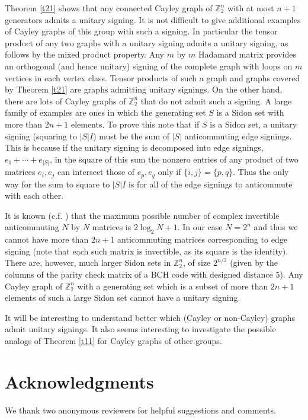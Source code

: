 \documentclass[11pt]{article}
\begin{document}
Theorem \ref{t21} shows that any connected Cayley graph of 
${\mathbb{Z}_{2}^{n}}$ with at most $n+1$ generators admits a unitary signing. 
It is not difficult to give additional examples of
Cayley graphs of this group with such a signing. In particular
the tensor product of any two graphs with a unitary signing
admits a unitary signing, as follows by the mixed product property.
Any $m$ by $m$ Hadamard matrix provides an orthogonal (and hence
unitary) signing of the complete graph with loops on $m$ vertices
in each vertex class. Tensor products of such a graph and graphs
covered by Theorem \ref{t21} are graphs admitting unitary
signings. On the other hand, there are lots of Cayley graphs of
${\mathbb{Z}_{2}^{n}}$ that do not admit  such a signing. A large family of examples
are ones in which the generating set $S$ is a Sidon set with more
than  $2n+1$ elements. To prove this note that if
$S$ is a Sidon set, a unitary signing (squaring to $|S|I$) must
be the sum of $|S|$ anticommuting edge signings. This is because
if the unitary signing is 
decomposed into edge
signings, $e_1 + \cdots + e_{|S|}$, in the square of this sum
the nonzero entries of any product of two matrices  $e_i,e_j$
can intersect those of $e_p,e_q$ only if $\{i,j\}=\{p,q\}$. Thus
the only way for the sum to square to $|S|I$ is for
all of the edge signings to anticommute with each other.

It is known (c.f. \cite{Hr}) that the maximum possible number of complex
invertible anticommuting $N$ by $N$  matrices is
$2 \log_2 N+1$. In our case $N=2^n$ and thus we cannot have more than
$2n+1$ anticommuting matrices corresponding to edge signing (note that
each such matrix is invertible, as its square is the identity).
There are, however, much larger Sidon sets in ${\mathbb{Z}_{2}^{n}}$, 
of size $2^{n/2}$
(given by the columns of the parity check matrix of a BCH code with designed
distance $5$). Any Cayley graph of ${\mathbb{Z}_{2}^{n}}$ with a generating set which is a 
subset of more than $2n+1$ elements of such a large Sidon set cannot have
a unitary signing.

It will be interesting to understand better which (Cayley or non-Cayley) 
graphs admit unitary signings. It also seems interesting to investigate
the possible analogs of Theorem \ref{t11} for Cayley graphs of other groups.


\section*{Acknowledgments} %
We thank two anonymous reviewers for helpful suggestions
and comments.
\end{document}
